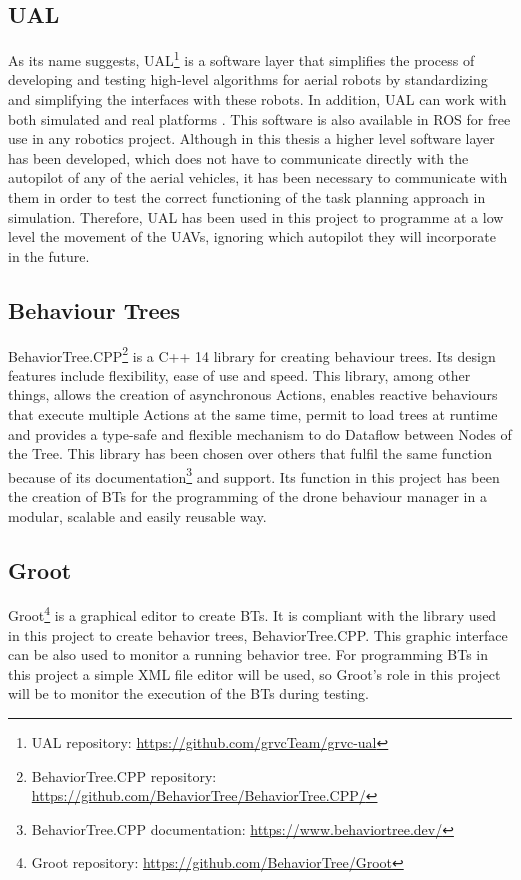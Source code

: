 \subsection{UAL}
\label{subsec:UAL}
As its name suggests, \gls{UAL}\footnote{UAL repository: \url{https://github.com/grvcTeam/grvc-ual}} is a software layer that simplifies the process of developing and testing high-level algorithms for aerial robots by standardizing and simplifying the interfaces with these robots. In addition, \gls{UAL} can work with both simulated and real platforms \cite{real_ijars20}. This software is also available in \gls{ROS} for free use in any robotics project. Although in this thesis a higher level software layer has been developed, which does not have to communicate directly with the autopilot of any of the aerial vehicles, it has been necessary to communicate with them in order to test the correct functioning of the task planning approach in simulation. Therefore, \gls{UAL} has been used in this project to programme at a low level the movement of the \glspl{UAV}, ignoring which autopilot they will incorporate in the future.

\subsection{Behaviour Trees}
\label{subsec:BehaviourTrees}
BehaviorTree.CPP\footnote{BehaviorTree.CPP repository: \url{https://github.com/BehaviorTree/BehaviorTree.CPP/}} is a C++ 14 library for creating behaviour trees. Its design features include flexibility, ease of use and speed. This library, among other things, allows the creation of asynchronous Actions, enables reactive behaviours that execute multiple Actions at the same time, permit to load trees at runtime and provides a type-safe and flexible mechanism to do Dataflow between Nodes of the Tree. This library has been chosen over others that fulfil the same function because of its documentation\footnote{BehaviorTree.CPP documentation: \url{https://www.behaviortree.dev/}} and support. Its function in this project has been the creation of \glspl{BT} for the programming of the drone behaviour manager in a modular, scalable and easily reusable way.

\subsection{Groot}
\label{subsec:Groot}
Groot\footnote{Groot repository: \url{https://github.com/BehaviorTree/Groot}} is a graphical editor to create \glspl{BT}. It is compliant with the library used in this project to create behavior trees, BehaviorTree.CPP. This graphic interface can be also used to monitor a running behavior tree. For programming \glspl{BT} in this project a simple XML file editor will be used, so Groot's role in this project will be to monitor the execution of the \glspl{BT} during testing.

